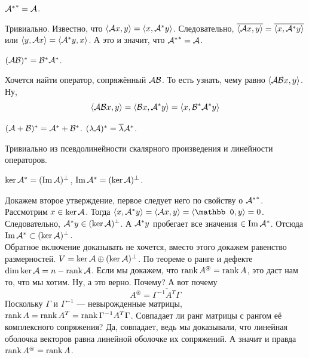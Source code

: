 \documentclass{article}
\DeclareMathOperator{\operIm}{Im}
\let\Im\operIm
\begin{document}
\begin{itemize}
\begin{Comment}
        \end{Comment}
        \thm ${{\mathcal{A}}^*}^*={\mathcal{A}}$.
        \begin{Proof}
            Тривиально. Известно, что ${\left\langle{{\mathcal{A}}x},{y}\right\rangle}={\left\langle{x},{{\mathcal{A}}^*y}\right\rangle}$. Следовательно, $\overline{{\left\langle{{\mathcal{A}}x},{y}\right\rangle}}=\overline{{\left\langle{x},{{\mathcal{A}}^*y}\right\rangle}}$ или ${\left\langle{y},{{\mathcal{A}} x}\right\rangle}={\left\langle{{\mathcal{A}}^*y},{x}\right\rangle}$. А это и значит, что ${{\mathcal{A}}^*}^*={\mathcal{A}}$.
        \end{Proof}
        \thm $({\mathcal{A}}{\mathcal{B}})^*={\mathcal{B}}^*{\mathcal{A}}^*$.
        \begin{Proof}
            Хочется найти оператор, сопряжённый ${\mathcal{A}}{\mathcal{B}}$. То есть узнать, чему равно ${\left\langle{{\mathcal{A}}{\mathcal{B}}x},{y}\right\rangle}$. Ну,
            $${\left\langle{{\mathcal{A}}{\mathcal{B}}x},{y}\right\rangle}={\left\langle{{\mathcal{B}}x},{{\mathcal{A}}^*y}\right\rangle}={\left\langle{x},{{\mathcal{B}}^*{\mathcal{A}}^*y}\right\rangle}$$
        \end{Proof}
        \thm $({\mathcal{A}}+{\mathcal{B}})^*={\mathcal{A}}^*+{\mathcal{B}}^*$.
        \thm $(\lambda{\mathcal{A}})^*=\overline\lambda{\mathcal{A}}^*$.
        \begin{Proof}
            Тривиально из псевдолинейности скалярного произведения и линейности операторов.
        \end{Proof}
        \thm $\ker\scriptA^*=(\Im\scriptA)^\perp$, $\Im\scriptA^*=(\ker\scriptA)^\perp$.
        \begin{Proof}
            Докажем второе утверждение, первое следует него по свойству о ${{\mathcal{A}}^*}^*$.\\
            Рассмотрим $x\in\ker{\mathcal{A}}$. Тогда $\dotprod{x}{\scriptA^*y}=\dotprod{\scriptA x}{y}=\dotprod{\mathbb0}{y}=0$. Следовательно, ${\mathcal{A}}^*y\in(\ker{\mathcal{A}})^\perp$. А ${\mathcal{A}}^*y$ пробегает все значения $\in\Im\scriptA^*$. Отсюда $\Im\scriptA^*\subset(\ker\scriptA)^\perp$.\\
            Обратное включение доказывать не хочется, вместо этого докажем равенство размерностей. $V=\ker{\mathcal{A}}\oplus(\ker{\mathcal{A}})^\perp$. По теореме о ранге и дефекте $\dim\ker{\mathcal{A}}=n-\operatorname{rank}{\mathcal{A}}$. Если мы докажем, что $\operatorname{rank} A^\circledast=\operatorname{rank} A$, это даст нам то, что мы хотим. Ну, а это верно. Почему? А вот почему
            $$
            A^\circledast=\overline{\Gamma^{-1}A^T\Gamma}
            $$
            Поскольку $\Gamma$ и $\Gamma^{-1}$ --- невырожденные матрицы, $\operatorname{rank} A=\operatorname{rank} A^T=\operatorname{rank}\Gamma^{-1}A^T\Gamma$. Совпадает ли ранг матрицы с рангом её комплексного сопряжения? Да, совпадает, ведь мы доказывали, что линейная оболочка векторов равна линейной оболочке их сопряжений. А значит и правда $\operatorname{rank} A^\circledast=\operatorname{rank} A$.

\end{Proof}
\end{itemize}
\end{document}
